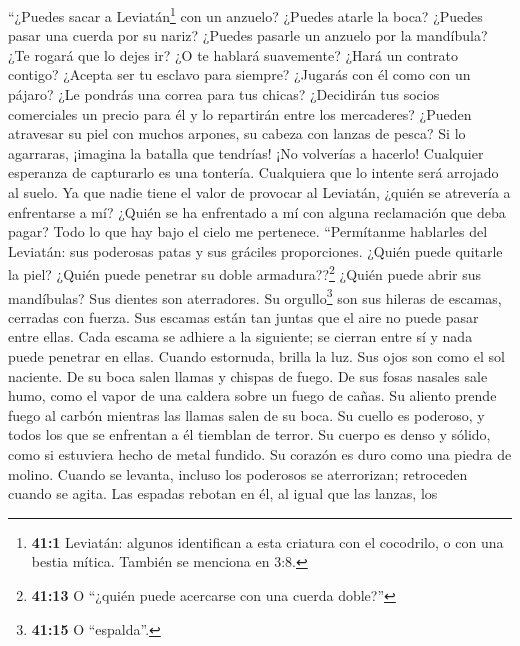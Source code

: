  ``¿Puedes sacar a Leviatán\footnote{\textbf{41:1}
  Leviatán: algunos identifican a esta criatura con el cocodrilo, o con
  una bestia mítica. También se menciona en 3:8.} con un anzuelo?
¿Puedes atarle la boca?  ¿Puedes pasar una cuerda por su
nariz? ¿Puedes pasarle un anzuelo por la mandíbula?  ¿Te
rogará que lo dejes ir? ¿O te hablará suavemente?  ¿Hará
un contrato contigo? ¿Acepta ser tu esclavo para siempre? 
¿Jugarás con él como con un pájaro? ¿Le pondrás una correa para tus
chicas?  ¿Decidirán tus socios comerciales un precio para
él y lo repartirán entre los mercaderes?  ¿Pueden
atravesar su piel con muchos arpones, su cabeza con lanzas de pesca?
 Si lo agarraras, ¡imagina la batalla que tendrías! ¡No
volverías a hacerlo!  Cualquier esperanza de capturarlo es
una tontería. Cualquiera que lo intente será arrojado al suelo.
 Ya que nadie tiene el valor de provocar al Leviatán,
¿quién se atrevería a enfrentarse a mí?  ¿Quién se ha
enfrentado a mí con alguna reclamación que deba pagar? Todo lo que hay
bajo el cielo me pertenece.  ``Permítanme hablarles del
Leviatán: sus poderosas patas y sus gráciles proporciones.
 ¿Quién puede quitarle la piel? ¿Quién puede penetrar su
doble armadura??\footnote{\textbf{41:13} O ``¿quién puede acercarse con
  una cuerda doble?''}  ¿Quién puede abrir sus
mandíbulas? Sus dientes son aterradores.  Su
orgullo\footnote{\textbf{41:15} O ``espalda''.} son sus hileras de
escamas, cerradas con fuerza.  Sus escamas están tan
juntas que el aire no puede pasar entre ellas.  Cada
escama se adhiere a la siguiente; se cierran entre sí y nada puede
penetrar en ellas.  Cuando estornuda, brilla la luz. Sus
ojos son como el sol naciente.  De su boca salen llamas y
chispas de fuego.  De sus fosas nasales sale humo, como
el vapor de una caldera sobre un fuego de cañas.  Su
aliento prende fuego al carbón mientras las llamas salen de su boca.
 Su cuello es poderoso, y todos los que se enfrentan a él
tiemblan de terror.  Su cuerpo es denso y sólido, como si
estuviera hecho de metal fundido.  Su corazón es duro
como una piedra de molino.  Cuando se levanta, incluso
los poderosos se aterrorizan; retroceden cuando se agita.
 Las espadas rebotan en él, al igual que las lanzas, los
